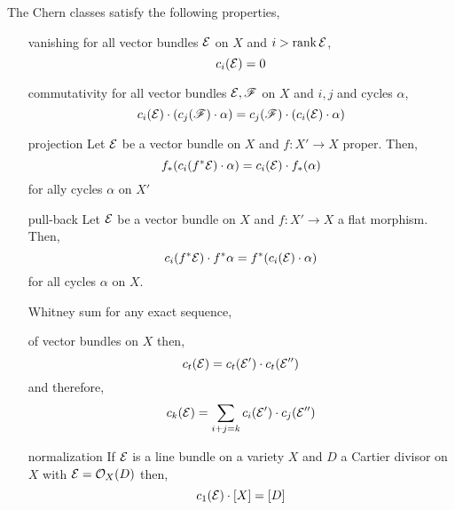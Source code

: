 \documentclass[12pt]{article}
\begin{document}
\begin{theorem}
The Chern classes satisfy the following properties,
\begin{enumerate}
\item[vanishing] for all vector bundles $\mathcal{E}$ on $X$ and $i > \operatorname{\mathrm{rank}}{\mathcal{E}}$,
\[ c_i(\mathcal{E}) = 0 \]
\item[commutativity] for all vector bundles $\mathcal{E}, \mathscr{F}$ on $X$ and $i, j$ and cycles $\alpha$,
\[ c_i(\mathcal{E}) \cdot (c_j(\mathscr{F}) \cdot \alpha) = c_j(\mathscr{F}) \cdot (c_i(\mathcal{E}) \cdot \alpha) \]

\item[projection] Let $\mathcal{E}$ be a vector bundle on $X$ and $f : X' \to X$ proper. Then,
\[ f_* (c_i(f^* \mathcal{E}) \cdot \alpha) = c_i(\mathcal{E}) \cdot f_* (\alpha) \]
for ally cycles $\alpha$ on $X'$

\item[pull-back] Let $\mathcal{E}$ be a vector bundle on $X$ and $f : X' \to X$ a flat morphism. Then,
\[ c_i(f^* \mathcal{E}) \cdot f^* \alpha = f^* (c_i(\mathcal{E}) \cdot \alpha) \]
for all cycles $\alpha$ on $X$.

\item[Whitney sum] for any exact sequence,
\begin{center}
\end{center}
of vector bundles on $X$ then,
\[ c_t(\mathcal{E}) = c_t(\mathcal{E}') \cdot c_t(\mathcal{E}'') \]
and therefore,
\[ c_k(\mathcal{E}) = \sum_{i+j = k} c_i(\mathcal{E}') \cdot c_j(\mathcal{E}'') \]

\item[normalization] If $\mathcal{E}$ is a line bundle on a variety $X$ and $D$ a Cartier divisor on $X$ with $\mathcal{E} = \mathcal{O}_{X}(D)$ then,
\[ c_1(\mathcal{E}) \cdot [X] = [D] \]
\end{enumerate}
\end{theorem}
\end{document}
